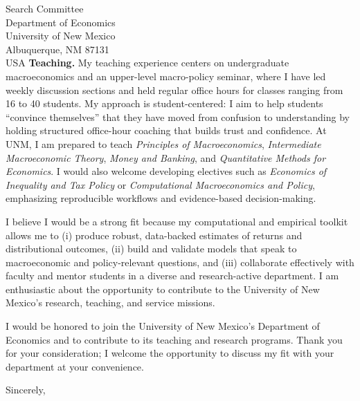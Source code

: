 \documentclass[11pt,letterpaper]{letter}
\begin{document}
\begin{letter}{Search Committee \\
Department of Economics \\
University of New Mexico \\
Albuquerque, NM 87131 \\ USA}
\textbf{Teaching.} My teaching experience centers on undergraduate macroeconomics and an upper-level macro-policy seminar, where I have led weekly discussion sections and held regular office hours for classes ranging from 16 to 40 students. My approach is student-centered: I aim to help students “convince themselves” that they have moved from confusion to understanding by holding structured office-hour coaching that builds trust and confidence. At UNM, I am prepared to teach \textit{Principles of Macroeconomics}, \textit{Intermediate Macroeconomic Theory}, \textit{Money and Banking}, and \textit{Quantitative Methods for Economics}. I would also welcome developing electives such as \textit{Economics of Inequality and Tax Policy} or \textit{Computational Macroeconomics and Policy}, emphasizing reproducible workflows and evidence-based decision-making.

I believe I would be a strong fit because my computational and empirical toolkit allows me to (i) produce robust, data-backed estimates of returns and distributional outcomes, (ii) build and validate models that speak to macroeconomic and policy-relevant questions, and (iii) collaborate effectively with faculty and mentor students in a diverse and research-active department. I am enthusiastic about the opportunity to contribute to the University of New Mexico’s research, teaching, and service missions.

I would be honored to join the University of New Mexico’s Department of Economics and to contribute to its teaching and research programs. Thank you for your consideration; I welcome the opportunity to discuss my fit with your department at your convenience.

\closing{Sincerely,}

\end{letter}
\end{document}
